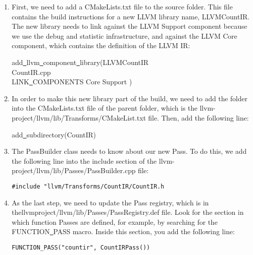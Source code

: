 \begin{enumerate}
	\item First, we need to add a CMakeLists.txt file to the source folder. This file contains the build instructions for a new LLVM library name, LLVMCountIR. The new library needs to link against the LLVM Support component because we use the debug and statistic infrastructure, and against the LLVM Core component, which contains the definition of the LLVM IR:
	\begin{tcolorbox}[colback=white,colframe=black]
		add\underline{~}llvm\underline{~}component\underline{~}library(LLVMCountIR \\
		\hspace*{0.5cm}CountIR.cpp \\
		\hspace*{0.5cm}LINK\underline{~}COMPONENTS Core Support )
	\end{tcolorbox}
	
	\item In order to make this new library part of the build, we need to add the folder into the CMakeLists.txt file of the parent folder, which is the llvm-project/llvm/lib/Transforms/CMakeList.txt file. Then, add the following line:
	\begin{tcolorbox}[colback=white,colframe=black]
		add\underline{~}subdirectory(CountIR)
	\end{tcolorbox}
	
	\item The PassBuilder class needs to know about our new Pass. To do this, we add the following line into the include section of the llvm-project/llvm/lib/Passes/PassBuilder.cpp file:
	\begin{lstlisting}[caption={}]
		#include "llvm/Transforms/CountIR/CountIR.h
	\end{lstlisting}
	
	\item As the last step, we need to update the Pass registry, which is in thellvmproject/llvm/lib/Passes/PassRegistry.def file. Look for the section in which function Passes are defined, for example, by searching for the FUNCTION\underline{~}PASS macro. Inside this section, you add the following line:
	\begin{lstlisting}[caption={}]
		FUNCTION_PASS("countir", CountIRPass())
	\end{lstlisting}
	

\end{enumerate}
